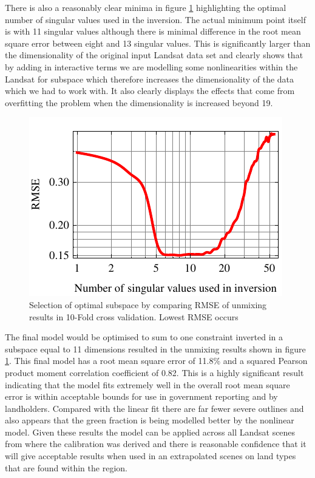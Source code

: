 \documentclass[remotesensing,article,accept,moreauthors,pdftex,12pt,a4paper]{mdpi}
\begin{document}
There is also a reasonably clear minima in figure \ref{fig:xValidationSVs} highlighting the optimal number of singular values used in the inversion. The actual minimum point itself is with 11 singular values although there is minimal difference in the root mean square error between eight and 13 singular values. This is significantly larger than the dimensionality of the original input Landsat data set and clearly shows that by adding in interactive terms we are modelling some nonlinearities within the Landsat for subspace which therefore increases the dimensionality of the data which we had to work with. It also clearly displays the effects that come from overfitting the problem when the dimensionality is increased beyond 19.

\begin{figure} 

\includegraphics{xValPlotPlot.pdf}\caption{\label{fig:xValidationSVs}Selection of optimal subspace by comparing RMSE of unmixing results in 10-Fold cross validation. Lowest RMSE occurs } 

 \end{figure} 

The final model would be optimised to sum to one constraint inverted in a subspace equal to 11 dimensions resulted in the unmixing results shown in figure \ref{fig:xValidationSVs}. This final model has a root mean square error of 11.8\% and a squared Pearson product moment correlation coefficient of 0.82. This is a highly significant result indicating that the model fits extremely well in the overall root mean square error is within acceptable bounds for use in government reporting and by landholders. Compared with the linear fit there are far fewer severe outlines and also appears that the green fraction is being modelled better by the nonlinear model. Given these results the model can be applied across all Landsat scenes from where the calibration was derived and there is reasonable confidence that it will give acceptable results when used in an extrapolated scenes on land types that are found within the region.
\end{document}

